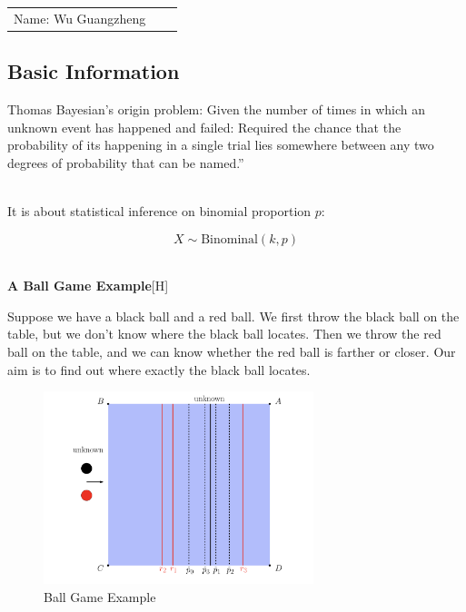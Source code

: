 \documentclass[12pt]{article}
\begin{document}
\vfill
\begin{large}

\begin{table}[h!]
\flushleft
\begin{tabular}{lll}
Name: Wu Guangzheng \hspace*{2em}&

\end{tabular}
\end{table}
\end{large}
\newpage
\begin{flushleft}


\section{Basic Information}

\qquad Thomas Bayesian's origin problem: Given the number of times in which an unknown event has happened and failed: Required the chance that the probability of its happening in a single trial lies somewhere between any two degrees of probability that can be named.”

~\\

\qquad It is about statistical inference on binomial proportion $p$:

$$X \sim \text{Binominal}(k,p)$$

~\\

\textbf{A Ball Game Example}[H]

\qquad Suppose we have a black ball and a red ball. We first throw the black ball on the table, but we don't know where the black ball locates. Then we throw the red ball on the table, and we can know whether the red ball is farther or closer. Our aim is to find out where exactly the black ball locates.

\begin{figure}[H]
\centering
\includegraphics[width = 0.7\textwidth]{ball-game.png}
\caption{Ball Game Example}
\end{figure}


\end{flushleft}
\end{document}

